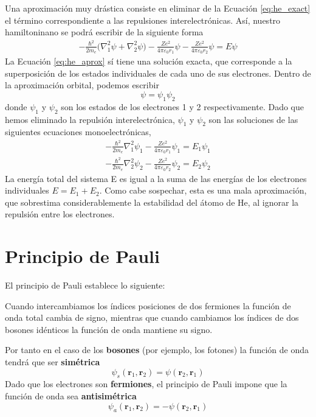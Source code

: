 Una aproximación muy drástica consiste en eliminar de la Ecuación 
\ref{eq:he_exact} el término correspondiente a las repulsiones 
interelectrónicas. Así, nuestro hamiltoninano se podrá escribir
de la siguiente forma
\begin{align}
    -\frac{\hbar^2}{2m_e}\big(\nabla_1^2\psi + \nabla_2^2\psi\big)
    -\frac{Ze^2}{4\pi \varepsilon_0r_1}\psi 
    -\frac{Ze^2}{4\pi \varepsilon_0r_2}\psi 
    = E\psi
\label{eq:he_aprox}    
\end{align}
La Ecuación \ref{eq:he_aprox} sí tiene una solución exacta, que 
corresponde a la superposición de los estados individuales de 
cada uno de sus electrones. Dentro de la aproximación orbital, 
podemos escribir 
\begin{equation}
    \psi=\psi_1\psi_2
\end{equation}
donde $\psi_1$ y $\psi_2$ son los estados de los electrones  
1 y 2 respectivamente. Dado que hemos eliminado la repulsión
interelectrónica, $\psi_1$ y $\psi_2$ son las soluciones de 
las siguientes ecuaciones monoelectrónicas,
\begin{align}
    -\frac{\hbar^2}{2m_e}\nabla_1^2\psi_1 -\frac{Ze^2}{4\pi \varepsilon_0r_1}\psi_1
    = E_1\psi_1\\
    -\frac{\hbar^2}{2m_e}\nabla_2^2\psi_2 -\frac{Ze^2}{4\pi \varepsilon_0r_2}\psi_2
    = E_2\psi_2
\label{eq:he_aprox}    
\end{align}
La energía total del sistema Ε es igual a la suma de las 
energías de los electrones individuales $E=E_1 + E_2$. Como
cabe sospechar, esta es una mala aproximación, que sobrestima
considerablemente la estabilidad del átomo de He, al ignorar 
la repulsión entre los electrones.


\section{Principio de Pauli}
El principio de Pauli establece lo siguiente: 
\begin{displayquote}
Cuando intercambiamos los índices posiciones de dos fermiones 
la función de onda total cambia de signo, mientras que cuando
cambiamos los índices de dos bosones idénticos la función de onda
mantiene su signo.
\end{displayquote}
Por tanto en el caso de los \textbf{bosones} (por ejemplo, los fotones)
la función de onda tendrá que ser
\textbf{simétrica}
\begin{equation}
    \psi_s(\mathbf{r}_1,\mathbf{r}_2)=\psi(\mathbf{r}_2,\mathbf{r}_1)
\end{equation}
Dado que los electrones son \textbf{fermiones}, el principio de
Pauli impone que la función de onda sea \textbf{antisimétrica}
\begin{equation}
    \psi_a(\mathbf{r}_1,\mathbf{r}_2)=-\psi(\mathbf{r}_2,\mathbf{r}_1)
\end{equation}


